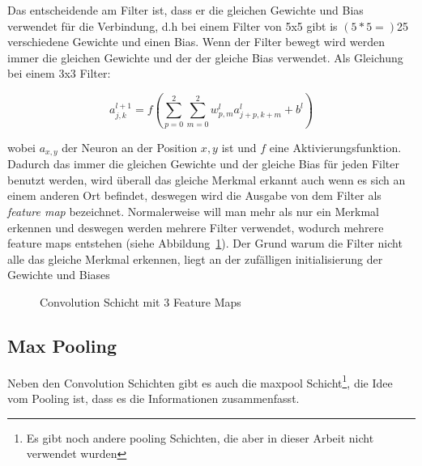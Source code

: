\documentclass[12pt,a4paper]{report}
\begin{document}
Das entscheidende am Filter ist, dass er die gleichen Gewichte und Bias verwendet für die Verbindung, d.h bei einem
Filter von 5x5 gibt is $(5*5=)$25 verschiedene Gewichte und einen Bias.
Wenn der Filter bewegt wird werden immer die gleichen Gewichte und der der gleiche Bias verwendet.
Als Gleichung bei einem 3x3 Filter:

\[a^{l+1}_{j,k} = f\left(\sum_{p=0}^{2}\sum_{m=0}^{2}w^l_{p,m}a^l_{j+p,k+m} + b^l\right)\]

wobei $a_{x, y}$ der Neuron an der Position $x, y$ ist und $f$ eine Aktivierungsfunktion.
Dadurch das immer die gleichen Gewichte und der gleiche Bias für jeden Filter benutzt werden,
wird überall das gleiche Merkmal erkannt auch wenn es sich an einem anderen Ort befindet,
deswegen wird die Ausgabe von dem Filter als \textit{feature map} bezeichnet.
Normalerweise will man mehr als nur ein Merkmal erkennen und deswegen werden mehrere Filter verwendet,
wodurch mehrere feature maps entstehen (siehe Abbildung~\ref{fig:conv4}).
Der Grund warum die Filter nicht alle das gleiche Merkmal erkennen, liegt an der zufälligen initialisierung der Gewichte und Biases

\begin{figure}[h]%
    \centering
{}
    \caption{Convolution Schicht mit 3 Feature Maps}%
    \label{fig:conv4}
\end{figure}

\subsection{Max Pooling}
Neben den Convolution Schichten gibt es auch die maxpool Schicht\footnote{Es gibt noch andere pooling Schichten, die aber in dieser Arbeit nicht verwendet wurden},
die Idee vom Pooling ist, dass es die Informationen zusammenfasst.
\end{document}

